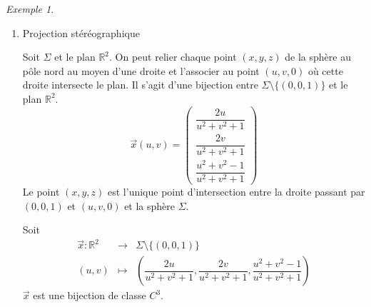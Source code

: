 \documentclass{report}
\theoremstyle{definition}
\theoremstyle{remark}
\newtheorem*{exem}{Exemple}
\def\RR{\mathbb{R}}
\begin{document}
\begin{exem}
\begin{enumerate}
			Ainsi, chaque point de $\Sigma$ se retrouve dans l'image d'une de ces param\'etrisations, d'o\`u $\Sigma$ est une surface.
			\item Projection st\'er\'eographique

			Soit $\Sigma$ et le plan $\RR^2$. On peut relier chaque point $(x,y,z)$ de la sph\`ere au p\^ole nord au moyen d'une droite et l'associer au point $(u,v,0)$ o\`u cette droite intersecte le plan. Il s'agit d'une bijection entre $\Sigma\setminus\{(0,0,1)\}$ et le plan $\RR^2$.
			\[ \vec x(u,v) = \begin{pmatrix}
				\dfrac{2u}{u^2+v^2+1}\\
				\dfrac{2v}{u^2+v^2+1}\\
				\dfrac{u^2+v^2-1}{u^2+v^2+1}
			\end{pmatrix} \]
			Le point $(x,y,z)$ est l'unique point d'intersection entre la droite passant par $(0,0,1)$ et $(u,v,0)$ et la sph\`ere $\Sigma$.

			Soit \[ \begin{array}{rcl}
				\vec x:\RR^2&\to&\Sigma\setminus\{(0,0,1)\}\\
				(u,v)&\mapsto&\left( \dfrac{2u}{u^2+v^2+1}, \dfrac{2v}{u^2+v^2+1}, \dfrac{u^2+v^2-1}{u^2+v^2+1} \right)
			\end{array} \] $\vec x$ est une bijection de classe $C^3$.


\end{enumerate}
\end{exem}
\end{document}
